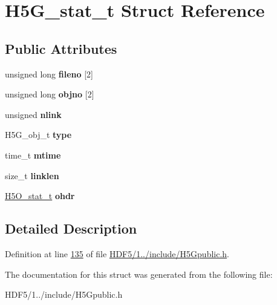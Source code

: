 \hypertarget{struct_h5_g__stat__t}{}\section{H5\+G\+\_\+stat\+\_\+t Struct Reference}
\label{struct_h5_g__stat__t}
\subsection*{Public Attributes}
\begin{DoxyCompactItemize}
\item 
\mbox{\label{struct_h5_g__stat__t_a11e8b05849f807c249f4cbf1a3f02463}} 
unsigned long {\bfseries fileno} \mbox{[}2\mbox{]}
\item 
\mbox{\label{struct_h5_g__stat__t_a913919d35b3f5f750a8a5ffce159148b}} 
unsigned long {\bfseries objno} \mbox{[}2\mbox{]}
\item 
\mbox{\label{struct_h5_g__stat__t_aaada66e1ce98f9a7d92a9705239ce766}} 
unsigned {\bfseries nlink}
\item 
\mbox{\label{struct_h5_g__stat__t_ace76e387ce2c9951af38e49df855c93c}} 
H5\+G\+\_\+obj\+\_\+t {\bfseries type}
\item 
\mbox{\label{struct_h5_g__stat__t_af0ac8a5e3dabf382447b665bd08c5ce7}} 
time\+\_\+t {\bfseries mtime}
\item 
\mbox{\label{struct_h5_g__stat__t_a63e9ef6734536ca7e0f0fc1160935e0d}} 
size\+\_\+t {\bfseries linklen}
\item 
\mbox{\label{struct_h5_g__stat__t_aba50af97f8e7174fa15a67f22470823c}} 
\hyperlink{struct_h5_o__stat__t}{H5\+O\+\_\+stat\+\_\+t} {\bfseries ohdr}
\end{DoxyCompactItemize}


\subsection{Detailed Description}


Definition at line \hyperlink{_h_d_f5_21_810_81_2include_2_h5_gpublic_8h_source_l00135}{135} of file \hyperlink{_h_d_f5_21_810_81_2include_2_h5_gpublic_8h_source}{H\+D\+F5/1../include/\+H5\+Gpublic.\+h}.



The documentation for this struct was generated from the following file\+:\begin{DoxyCompactItemize}
\item 
H\+D\+F5/1../include/\+H5\+Gpublic.\+h\end{DoxyCompactItemize}
